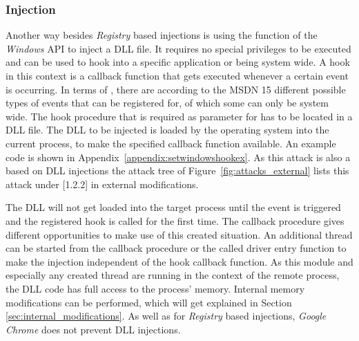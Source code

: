\subsubsection{ Injection}
Another way besides \emph{Registry} based injections is using the  function of the \emph{Windows} \gls{API} to inject a \gls{DLL} file. It requires no special privileges to be executed and can be used to  hook into a specific application or being system wide. A hook in this context is a callback function that gets executed whenever a certain event is occurring. In terms of , there are according to the \gls{MSDN} \cite{msdn_setwindowshookex} 15 different possible types of events that can be registered for, of which some can only be system wide. The hook procedure that is required as parameter for  has to be located in a \gls{DLL} file. The \gls{DLL} to be injected is loaded by the operating system into the current process, to make the specified callback function available. An example code is shown in Appendix~\ref{appendix:setwindowshookex}. As this attack is also a based on \gls{DLL} injections the attack tree of Figure~\ref{fig:attacks_external} lists this attack under [1.2.2] in external modifications. 

\medskip

The \gls{DLL} will not get loaded into the target process until the event is triggered and the registered hook is called for the first time. The callback procedure gives different opportunities to make use of this created situation. An additional thread can be started from the callback procedure or the called driver entry function to make the injection independent of the hook callback function. As this module and especially any created thread are running in the context of the remote process, the \gls{DLL} code has full access to the process' memory. Internal memory modifications can be performed, which will get explained in Section \ref{sec:internal_modifications}. As well as for \emph{Registry} based injections, \emph{Google Chrome} does not prevent  \gls{DLL} injections.